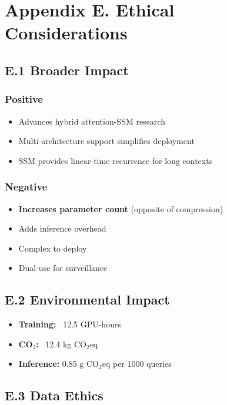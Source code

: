 
\section{Appendix E. Ethical Considerations}

\subsection{E.1 Broader Impact}

\subsubsection{Positive}
\begin{itemize}
\item Advances hybrid attention-SSM research
\item Multi-architecture support simplifies deployment
\item SSM provides linear-time recurrence for long contexts

\end{itemize}
\subsubsection{Negative}
\begin{itemize}
\item \textbf{Increases parameter count} (opposite of compression)
\item Adds inference overhead
\item Complex to deploy
\item Dual-use for surveillance

\end{itemize}
\subsection{E.2 Environmental Impact}

\begin{itemize}
\item \textbf{Training:} ~12.5 GPU-hours
\item \textbf{CO$_2$:} ~12.4 kg CO$_2$eq
\item \textbf{Inference:} 0.85 g CO$_2$eq per 1000 queries

\end{itemize}
\subsection{E.3 Data Ethics}

